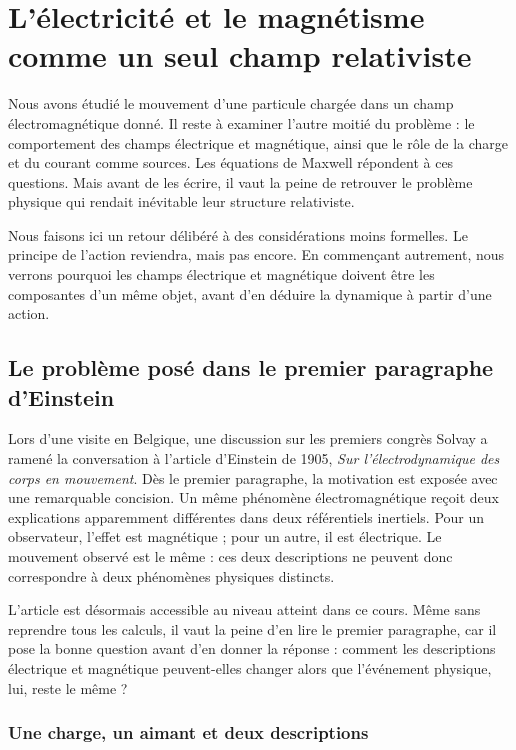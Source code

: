 \chapter{L’électricité et le magnétisme comme un seul champ relativiste}

Nous avons étudié le mouvement d’une particule chargée dans un champ électromagnétique donné. Il reste à examiner l’autre moitié du problème : le comportement des champs électrique et magnétique, ainsi que le rôle de la charge et du courant comme sources. Les équations de Maxwell répondent à ces questions. Mais avant de les écrire, il vaut la peine de retrouver le problème physique qui rendait inévitable leur structure relativiste.

Nous faisons ici un retour délibéré à des considérations moins formelles. Le principe de l’action reviendra, mais pas encore. En commençant autrement, nous verrons pourquoi les champs électrique et magnétique doivent être les composantes d’un même objet, avant d’en déduire la dynamique à partir d’une action.

\section{Le problème posé dans le premier paragraphe d’Einstein}

Lors d’une visite en Belgique, une discussion sur les premiers congrès Solvay a ramené la conversation à l’article d’Einstein de 1905, \emph{Sur l’électrodynamique des corps en mouvement}. Dès le premier paragraphe, la motivation est exposée avec une remarquable concision. Un même phénomène électromagnétique reçoit deux explications apparemment différentes dans deux référentiels inertiels. Pour un observateur, l’effet est magnétique ; pour un autre, il est électrique. Le mouvement observé est le même : ces deux descriptions ne peuvent donc correspondre à deux phénomènes physiques distincts.

L’article est désormais accessible au niveau atteint dans ce cours. Même sans reprendre tous les calculs, il vaut la peine d’en lire le premier paragraphe, car il pose la bonne question avant d’en donner la réponse : comment les descriptions électrique et magnétique peuvent-elles changer alors que l’événement physique, lui, reste le même ?

\subsection{Une charge, un aimant et deux descriptions}

